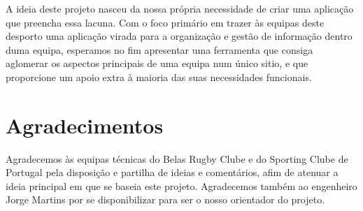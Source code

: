 \documentclass[a4paper,openright,twoside,11pt]{report}
\begin{document}
A ideia deste projeto nasceu da nossa própria necessidade de criar uma aplicação que preencha essa lacuna. Com o foco primário em trazer às equipas deste desporto uma aplicação virada para a organização e gestão de informação dentro duma equipa, esperamos no fim apresentar uma ferramenta que consiga aglomerar os aspectos principais de uma equipa num único sitio, e que proporcione um apoio extra à maioria das suas necessidades funcionais.


\cleardoublepage
\chapter*{Agradecimentos}
Agradecemos às equipas técnicas do Belas Rugby Clube e do Sporting Clube de Portugal pela disposição e partilha de ideias e comentários, afim de atenuar a ideia principal em que se baseia este projeto. Agradecemos também ao engenheiro Jorge Martins por se disponibilizar para ser o nosso orientador do projeto.

\cleardoublepage
\tableofcontents \cleardoublepage


\setcounter{page}{1}













%
%

\appendix

\end{document}
